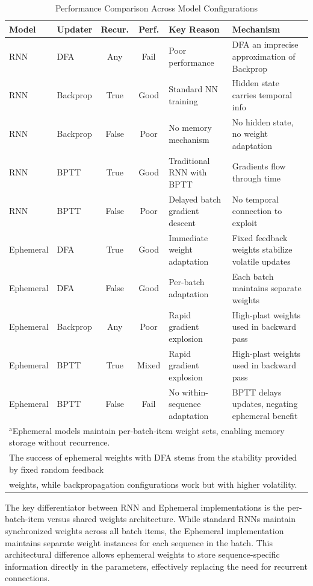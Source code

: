 \begin{table}[htbp]
\caption{Performance Comparison Across Model Configurations}
\begin{center}
\begin{tabular}{|l|l|c|c|l|l|}
\hline
\textbf{Model} & \textbf{Updater} & \textbf{Recur.} & \textbf{Perf.} & \textbf{Key Reason} & \textbf{Mechanism} \\
\hline
RNN & DFA & Any & Fail & Poor performance & DFA an imprecise approximation of Backprop \\
RNN & Backprop & True & Good & Standard NN training & Hidden state carries temporal info \\
RNN & Backprop & False & Poor & No memory mechanism & No hidden state, no weight adaptation \\
RNN & BPTT & True & Good & Traditional RNN with BPTT & Gradients flow through time \\
RNN & BPTT & False & Poor & Delayed batch gradient descent & No temporal connection to exploit \\
\hline
Ephemeral & DFA & True & Good & Immediate weight adaptation & Fixed feedback weights stabilize volatile updates \\
Ephemeral & DFA & False & Good & Per-batch adaptation & Each batch maintains separate weights \\
Ephemeral & Backprop & Any & Poor & Rapid gradient explosion & High-plast weights used in backward pass \\
Ephemeral & BPTT & True & Mixed & Rapid gradient explosion & High-plast weights used in backward pass \\
Ephemeral & BPTT & False & Fail & No within-sequence adaptation & BPTT delays updates, negating ephemeral benefit \\
\hline
\multicolumn{6}{l}{$^{\mathrm{a}}$Ephemeral models maintain per-batch-item weight sets, enabling memory storage without recurrence.} \\
\multicolumn{6}{l}{The success of ephemeral weights with DFA stems from the stability provided by fixed random feedback} \\
\multicolumn{6}{l}{weights, while backpropagation configurations work but with higher volatility.}
\end{tabular}
\label{tab:configuration_comparison}
\end{center}
\end{table}

The key differentiator between RNN and Ephemeral implementations is the per-batch-item versus shared weights architecture. While standard RNNs maintain synchronized weights across all batch items, the Ephemeral implementation maintains separate weight instances for each sequence in the batch. This architectural difference allows ephemeral weights to store sequence-specific information directly in the parameters, effectively replacing the need for recurrent connections.

